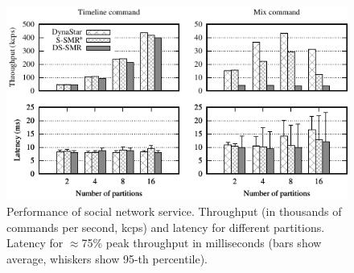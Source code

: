 
%
\begin{figure}[ht]
 \includegraphics[width=0.99\columnwidth]{figures/experiments/chirper-compare-full}
 \caption{Performance of social network service. Throughput (in thousands of commands per second, kcps) and latency for different partitions. 
  Latency for $\approx$75\% peak throughput in milliseconds (bars show average, whiskers show 95-th percentile).}
  \label{fig:socialscalability}
\end{figure}

